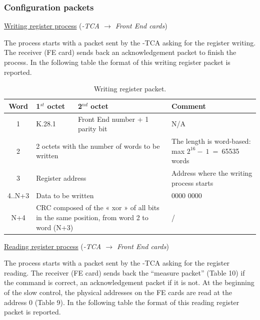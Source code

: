 \newpage
\subsubsection{Configuration packets\newline}

\underline{Writing register process} (\textit{{\charmu-TCA} $\rightarrow$ Front End cards})\newline

The process starts with a packet sent by the \charmu-TCA asking for the register writing. The receiver (FE card) sends back an acknowledgement packet to finish the process. In the following table the format of this writing register packet is reported.

\begin{table} [!htbp]
  \centering
  \caption{Writing register packet.}
\begin{tabular}{|c|p{4cm}|p{4cm}|p{4cm}|}
\hline
\bf{Word}  			& 	\bf{1$^{st}$ octet}	& \bf{2$^{nd}$ octet} & \bf{Comment} \\
\hline
1				&	K.28.1	& Front End number + 1 parity bit		& N/A  \\
\hline
2				&\multicolumn{2}{p{8cm}|}{2 octets with the number of words to be written}& The length is word-based: max $2^{16}-~1$~=~65535 words\\
\hline
3 			&      \multicolumn{2}{p{8cm}|}{Register address} & Address where the writing process starts\\
\hline
4..N+3        	&      \multicolumn{2}{p{8cm}|}{Data to be written} &0000 0000\\
\hline
N+4				 & \multicolumn{2}{p{8cm}|}{CRC composed of the « xor » of all bits in the same position, from word 2 to word (N+3)}&/\\
\hline
\end{tabular}
\end{table}

\newpage
\underline{Reading register process} (\textit{{\charmu-TCA} $\rightarrow$ Front End cards})\newline

The process starts with a packet sent by the \charmu-TCA asking for the register reading. The receiver (FE card) sends back the \enquote{measure packet} (Table 10) if the command is correct, an acknowledgement packet if it is not.\newline
At the beginning of the slow control, the physical addresses on the FE cards are read at the address 0 (Table 9).\newline
In the following table the format of this reading register packet is reported.



